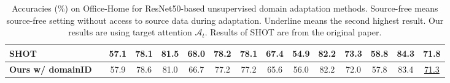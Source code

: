 \documentclass[10pt,twocolumn,letterpaper]{article}
\begin{document}
\begin{table*}[tbb]
\begin{center}
{{\begin{tabular}{lcccccccccccccc}
					\hline
					SHOT~\cite{liang2020we} &\bm{$\surd$}&57.1 &78.1& 81.5& 68.0& 78.2 &78.1 &67.4 &54.9 &82.2&73.3 &58.8&84.3&\textbf{71.8}  \\
\hline
				
					\textbf{Ours w/ domainID} &\bm{$\surd$}&57.9&78.6&81.0&66.7&77.2&77.2&65.6&56.0&82.2&72.0&57.8&83.4&\underline{71.3}
 \\
					\hline
		\end{tabular}}}
\caption{Accuracies (\%) on Office-Home for ResNet50-based unsupervised domain adaptation methods.  {Source-free} means source-free setting without access to source data during adaptation. Underline means the second highest result. Our results are using target attention $\mathcal{A}_t$. Results of SHOT are from the original paper.}
				\label{tab:home_da}
		\vspace{-4mm}
	\end{center}
\end{table*}
\end{document}
